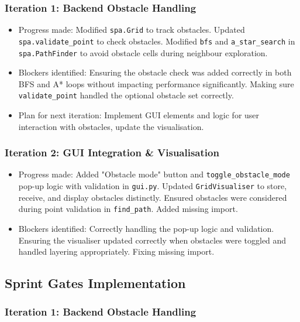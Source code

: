 \subsubsection{Iteration 1: Backend Obstacle Handling}
\begin{itemize}
	\item Progress made: Modified \verb|spa.Grid| to track obstacles. Updated \verb|spa.validate_point| to check obstacles. Modified \verb|bfs| and \verb|a_star_search| in \verb|spa.PathFinder| to avoid obstacle cells during neighbour exploration.
	\item Blockers identified: Ensuring the obstacle check was added correctly in both BFS and A* loops without impacting performance significantly. Making sure \verb|validate_point| handled the optional obstacle set correctly.
	\item Plan for next iteration: Implement GUI elements and logic for user interaction with obstacles, update the visualisation.
\end{itemize}

\subsubsection{Iteration 2: GUI Integration \& Visualisation}
\begin{itemize}
	\item Progress made: Added "Obstacle mode" button and \verb|toggle_obstacle_mode| pop-up logic with validation in \verb|gui.py|. Updated \verb|GridVisualiser| to store, receive, and display obstacles distinctly. Ensured obstacles were considered during point validation in \verb|find_path|. Added missing import.
	\item Blockers identified: Correctly handling the pop-up logic and validation. Ensuring the visualiser updated correctly when obstacles were toggled and handled layering appropriately. Fixing missing import.
\end{itemize}

\subsection{Sprint Gates Implementation}

\subsubsection{Iteration 1: Backend Obstacle Handling}

